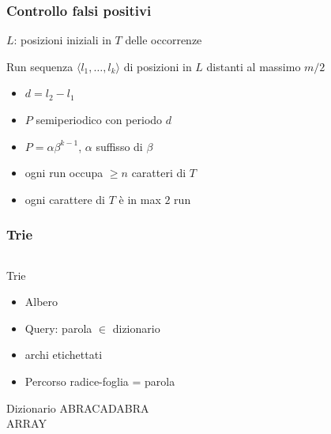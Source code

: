 \begin{frame}[fragile]
\frametitle{Controllo falsi positivi}
$L$: posizioni iniziali in $T$ delle occorrenze
\begin{block}{Run}
sequenza $\langle l_{1}, \ldots, l_{k}\rangle$ di posizioni in $L$ distanti al
massimo $m/2$
\end{block}

\begin{itemize}
\item
$d=l_{2}-l_{1}$
\item
$P$ semiperiodico con periodo $d$
\item
$P=\alpha\beta^{k-1}$, $\alpha$ suffisso di $\beta$
\item
ogni run occupa $\ge n$ caratteri di $T$
\item
ogni carattere  di $T$ è in max $2$ run
\end{itemize}
\end{frame}


\begin{frame}[fragile]
\frametitle{Trie}
\begin{columns}
\begin{column}{0.6\textwidth}
\begin{block}{Trie}
\begin{itemize}
\item
Albero
\item
Query: parola $\in$ dizionario
\item
archi etichettati
\item
Percorso radice-foglia = parola
\end{itemize}
\end{block}
\begin{block}{Dizionario}
ABRACADABRA\\
ARRAY\\
\end{block}
\end{column}
\begin{column}{0.4\textwidth}
\begin{center}
\end{center}
\end{column}
\end{columns}
\end{frame}

